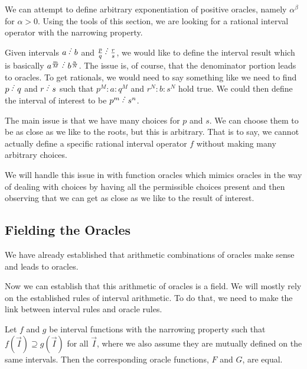 \documentclass[12pt]{article}
\begin{document}
We can attempt to define arbitrary exponentiation of positive oracles, namely $\alpha^{\beta}$ for $\alpha > 0$. Using the tools of this section, we are looking for a rational interval operator with the narrowing property. 

Given intervals $a \lte b$ and $\frac{p}{q} \lte \frac{r}{s}$, we would like to define the interval result which is basically $a^{\frac{m}{M}} \lte b^{\frac{n}{N}}$. The issue is, of course, that the denominator portion leads to oracles. To get rationals, we would need to say something like we need to find $p \lte q$ and $r \lte s$ such that $p^M : a : q^M$ and $r^N : b : s^N$ hold true. We could then define the interval of interest to be $p^m \lte s^n$. 

The main issue is that we have many choices for $p$ and $s$. We can choose them to be as close as we like to the roots, but this is arbitrary. That is to say, we cannot actually define a specific rational interval operator $f$ without making many arbitrary choices. 

We will handle this issue in \cite{taylor23funora} with function oracles which mimics oracles in the way of dealing with choices by having all the permissible choices present and then observing that we can get as close as we like to the result of interest. 


\subsection{Fielding the Oracles}

We have already established that arithmetic combinations of oracles make sense and leads to oracles. 


Now we can establish that this arithmetic of oracles is a field. We will mostly rely on the established rules of interval arithmetic. To do that, we need to make the link between interval rules and oracle rules. 


\begin{proposition}
Let $f$ and $g$ be interval functions with the narrowing property such that $f(\vec{I}) \supseteq g(\vec{I})$ for all $\vec{I}$, where we also assume they are mutually defined on the same intervals. Then the corresponding oracle functions, $F$ and $G$, are equal.  
\end{proposition}
\end{document}
